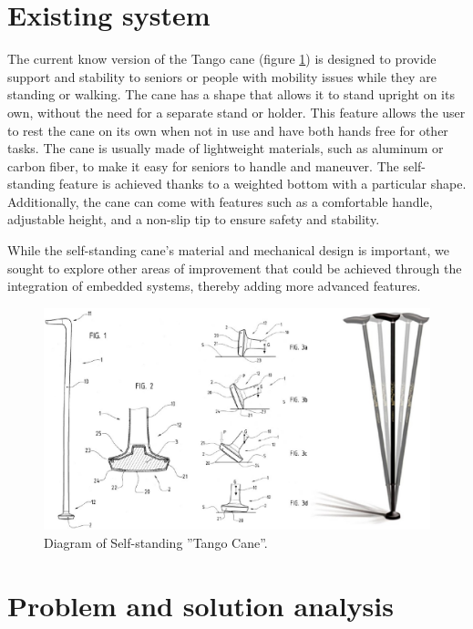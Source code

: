 \documentclass[12pt, twoside]{report}
\begin{document}
\section{Existing system}

The current know version of the Tango cane (figure \ref{fig:tango_org}) is designed to provide support and stability to seniors or people with mobility issues while they are standing or walking. The cane has a shape that allows it to stand upright on its own, without the need for a separate stand or holder. This feature allows the user to rest the cane on its own when not in use and have both hands free for other tasks. The cane is usually made of lightweight materials, such as aluminum or carbon fiber, to make it easy for seniors to handle and maneuver. The self-standing feature is achieved thanks to a weighted bottom with a particular shape. Additionally, the cane can come with features such as a comfortable handle, adjustable height, and a non-slip tip to ensure safety and stability.

While the self-standing cane's material and mechanical design is important, we sought to explore other areas of improvement that could be achieved through the integration of embedded systems, thereby adding more advanced features.

\begin{figure}[!h]
    \centering
    \includegraphics[width=\textwidth]{images/Project 3/tango_original.jpg}
    \caption{Diagram of Self-standing ”Tango Cane”.}
    \label{fig:tango_org}
\end{figure}

\section{Problem and solution analysis}
\end{document}
